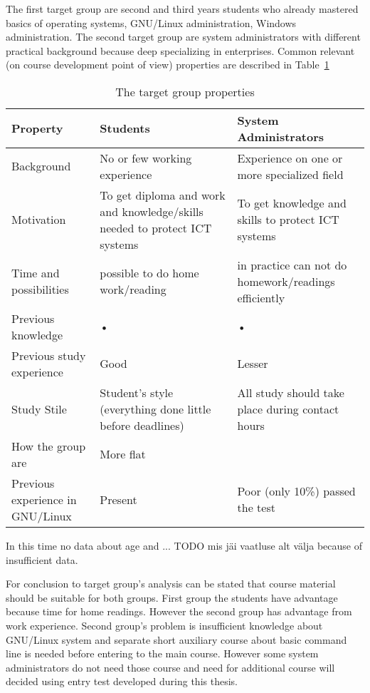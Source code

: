 The first target group are second and third years students who already mastered basics of operating systems, GNU/Linux administration, Windows administration. The second target group are system administrators with different practical background because deep specializing in enterprises. Common relevant (on course development point of view)  properties are described in Table~\ref{tab:targetgroup}
\begin{table}[h]
\centering
\caption{The target group properties}

\begin{tabular}{|p{4cm}|p{5cm}|p{5cm}|}
\hline 
\color{blue}
Property & \color{blue} Students & \color{blue} System Administrators \\ 
\hline 
Background & No or few working experience & Experience on one or more specialized field \\ 
\hline 
Motivation & To get diploma and work and knowledge/skills needed to protect \gls{ICT} systems & To get knowledge and skills to protect \gls{ICT} systems \\ 
\hline 
Time and possibilities & possible to do home work/reading & in practice can not do homework/readings efficiently  \\ 
\hline 
Previous knowledge & • & • \\ 
\hline 
Previous study experience & Good & Lesser \\ 
\hline 
Study Stile & Student's style (everything done little before deadlines) & All study should take place during contact hours  \\ 
\hline 
How {\color{red}{homogeenne}} the group are  & More flat & {\color{red}{ebaühtlane}} \\ 
\hline 
Previous experience in GNU/Linux & Present & Poor (only 10\%) passed the test  \\ 
\hline 
\end{tabular} 

\label{tab:targetgroup}
\end{table}

In this time no data about age and ... {\color{red} TODO mis jäi vaatluse alt välja} because of insufficient data. 



For conclusion to target group's analysis can be stated that course material should be suitable for both groups. First group the students have advantage because time for home readings. However the second group has advantage from work experience. Second group's problem is insufficient knowledge about GNU/Linux system and separate short auxiliary course about basic command line is needed before entering to the main course. However some system administrators do not need those course and need for additional course will decided using entry test developed during this thesis.

